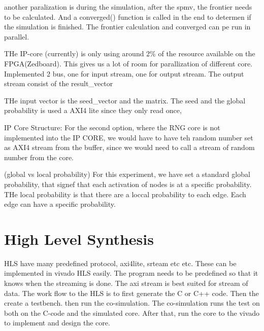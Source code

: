 another paralization is during the simulation, after the spmv, the frontier needs to be calculated. And a converged() function is called in the end to determen if the simulation is finished. The frontier calculation and converged can pe run in parallel. 

THe IP-core (currently) is only using around 2\% of the resource available on the FPGA(Zedboard). This gives us a lot of room for parallization of different core. Implemented 2 bus, one for input stream, one for output stream. The output stream consist of the result_vector

THe input vector is the seed_vector and the matrix. The seed and the global probability is used a AXI4 lite since they only read once, 


IP Core Structure:
For the second option, where the RNG core is not implemented into the IP CORE, we would have to have teh random number set as AXI4 stream from the buffer, since we would need to call a stream of random number from the core.


(global vs local probability)
For this experiment, we have set a standard global probability, that signef that each activation of nodes is at a specific probability. THe local probability is that there are a loccal probability to each edge. Each edge can have a specific probability.


\section{High Level Synthesis}
HLS have many predefined protocol, axi4lite, srteam etc etc. These can be implemented in vivado HLS easily. The program needs to be predefined so that it knows when the streaming is done. The axi stream is best suited for stream of data. The work flow to the HLS is to first generate the C or C++ code. Then the create a testbench. then run the co-simulation. The co-simulation runs the test on both on the C-code and the simulated core. After that, run the core to the vivado to implement and design the core. 
